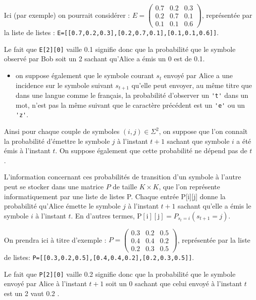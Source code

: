 Ici (par exemple) on pourrait considérer : $E=\left(\begin{array}{ccc}0.7 & 0.2 & 0.3 \\ 0.2 & 0.7 & 0.1 \\ 0.1 & 0.1 & 0.6\end{array}\right)$, représentée par la liste de listes : \lstinline{E=[[0.7,0.2,0.3],[0.2,0.7,0.1],[0.1,0.1,0.6]]}.

Le fait que \lstinline{E[2][0]} vaille 0.1 signifie donc que la probabilité que le symbole observé par Bob soit un 2 sachant qu'Alice a émis un 0 est de 0.1.

\begin{itemize}
  \item on suppose également que le symbole courant $s_{t}$ envoyé par Alice a une incidence sur le symbole suivant $s_{t+1}$ qu'elle peut envoyer, au même titre que dans une langue comme le français, la probabilité d'observer un \lstinline{'t'} dans un mot, n'est pas la même suivant que le caractère précédent est un \lstinline{'e'} ou un \lstinline{'z'}.
\end{itemize}

Ainsi pour chaque couple de symboles $(i, j) \in \Sigma^{2}$, on suppose que l'on connaît la probabilité d'émettre le symbole $j$ à l'instant $t+1$ sachant que symbole $i$ a été émis à l'instant $t$. On suppose également que cette probabilité ne dépend pas de $t$.

L'information concernant ces probabilités de transition d'un symbole à l'autre peut se stocker dans une matrice $P$ de taille $K \times K$, que l'on représente informatiquement par une liste de listes P. Chaque entrée P[i][j] donne la probabilité qu'Alice émette le symbole $j$ à l'instant $t+1$ sachant qu'elle a émis le symbole $i$ à l'instant $t$. En d'autres termes, $\mathrm{P}[\mathrm{i}][\mathrm{j}]=P_{s_{t}=i}\left(s_{t+1}=j\right)$.

On prendra ici à titre d'exemple : $P=\left(\begin{array}{ccc}0.3 & 0.2 & 0.5 \\ 0.4 & 0.4 & 0.2 \\ 0.2 & 0.3 & 0.5\end{array}\right)$, représentée par la liste de listes: \lstinline{P=[[0.3,0.2,0.5],[0.4,0.4,0.2],[0.2,0.3,0.5]]}.

Le fait que \lstinline{P[2][0]} vaille 0.2 signifie donc que la probabilité que le symbole envoyé par Alice à l'instant $t+1$ soit un 0 sachant que celui envoyé à l'instant $t$ est un 2 vaut 0.2 .

